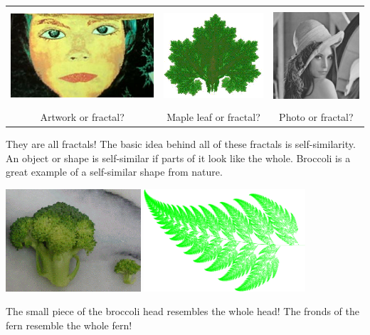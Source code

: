 \begin{center}
\begin{tabular}{ccc}
\includegraphics[height=1.4in]{images/fractalsEverywhere} & \includegraphics[height=1.4in]{images/MapleLeaf} & \includegraphics[height=1.4in]{images/LenaPhoto}\hfill \\
Artwork or fractal? & Maple leaf or fractal? & Photo or fractal?
\end{tabular}
\end{center}

They are all fractals! The basic idea behind all of these fractals is self-similarity. An object or shape is self-similar if parts of it look like the whole. Broccoli is a great example of a self-similar shape from nature.

\begin{center}
\includegraphics[height=1.5in]{images/broccoli}\hspace{.25in}
\includegraphics[height=1.5in]{images/fern}
\end{center}
The small piece of the broccoli head resembles the whole head! The fronds of the fern resemble the whole fern!

